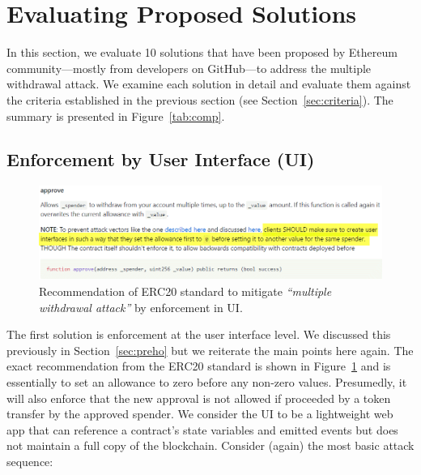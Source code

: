 
\section{Evaluating Proposed Solutions}\label{sec:eval}

In this section, we evaluate 10 solutions that have been proposed by Ethereum community---mostly from developers on GitHub---to address the multiple withdrawal attack. We examine each solution in detail and evaluate them against the criteria established in the previous section (see Section~\ref{sec:criteria}). The summary is presented in Figure~\ref{tab:comp}.


\subsection{Enforcement by User Interface (UI)}
\label{sec:enfui}

\begin{figure}[t!]
	\centering
	\includegraphics[width=1.0\linewidth]{figures/multiple_withdrawal_03.png}
	\caption{Recommendation of ERC20 standard to mitigate \textit{``multiple withdrawal attack''} by enforcement in UI.\label{fig:uie}}
\end{figure}

The first solution is enforcement at the user interface level. We discussed this previously in Section~\ref{sec:preho} but we reiterate the main points here again. The exact recommendation from the ERC20 standard is shown in Figure~\ref{fig:uie} and is essentially to set an allowance to zero before any non-zero values. Presumedly, it will also enforce that the new approval is not allowed if proceeded by a token transfer by the approved spender. We consider the UI to be a lightweight web app that can reference a contract's state variables and emitted events but does not maintain a full copy of the blockchain. Consider (again) the most basic attack sequence:


